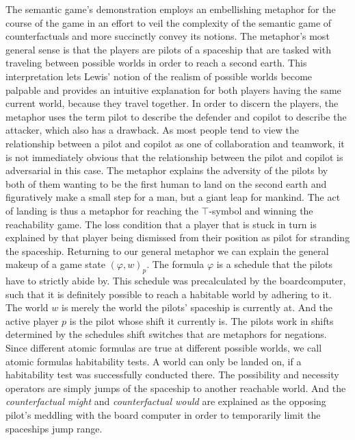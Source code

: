 \documentclass[a4paper,american,10pt]{paper}
\theoremstyle{definition}\newtheorem{lemma}[thm]{Lemma}
\theoremstyle{definition}\newtheorem{proposition}[thm]{Proposition}
\theoremstyle{definition}\newtheorem{corollary}[thm]{Corollary}
\theoremstyle{definition}\newtheorem{definition}{Definition}
\begin{document}
The semantic game's demonstration employs an embellishing metaphor for the course of the game in an effort to veil the complexity of the semantic game of counterfactuals and more succinctly convey its notions. The metaphor's most general sense is that the players are pilots of a spaceship that are tasked with traveling between possible worlds in order to reach a second earth. This interpretation lets Lewis' notion of the realism of possible worlds become palpable and provides an intuitive explanation for both players having the same current world, because they travel together. In order to discern the players, the metaphor uses the term pilot to describe the defender and copilot to describe the attacker, which also has a drawback. As most people tend to view the relationship between a pilot and copilot as one of collaboration and teamwork, it is not immediately obvious that the relationship between the pilot and copilot is adversarial in this case. The metaphor explains the adversity of the pilots by both of them wanting to be the first human to land on the second earth and figuratively make a small step for a man, but a giant leap for mankind. The act of landing is thus a metaphor for reaching the $\top$-symbol and winning the reachability game. The loss condition that a player that is stuck in turn is explained by that player being dismissed from their position as pilot for stranding the spaceship. Returning to our general metaphor we can explain the general makeup of a game state $(\varphi, w)_p$. The formula $\varphi$ is a schedule that the pilots have to strictly abide by. This schedule was precalculated by the boardcomputer, such that it is definitely possible to reach a habitable world by adhering to it. The world $w$ is merely the world the pilots' spaceship is currently at. And the active player $p$ is the pilot whose shift it currently is. The pilots work in shifts determined by the schedules shift switches that are metaphors for negations. Since different atomic formulas are true at different possible worlds, we call atomic formulas habitability tests. A world can only be landed on, if a habitability test was successfully conducted there. The possibility and necessity operators are simply jumps of the spaceship to another reachable world. And the \textit{counterfactual might} and \textit{counterfactual would} are explained as the opposing pilot's meddling with the board computer in order to temporarily limit the spaceships jump range.
\newpage
\end{document}
